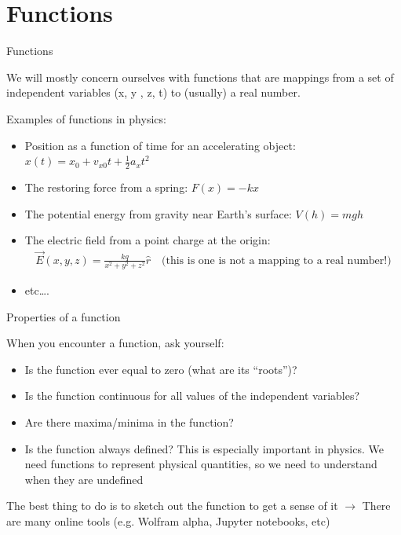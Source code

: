 \documentclass[aspectratio=169,
hyperref={colorlinks,urlcolor=blue}
]{beamer}
\begin{document}
\section{Functions}
\label{sec:functions}
\begin{bulletframe}{Functions}
 \item We will mostly concern ourselves with functions that are mappings from a set of independent variables (x, y , z, t) to (usually) a real number.
 \item Examples of functions in physics:
 \begin{itemize}
  \item Position as a function of time for an accelerating object: $x(t)=x_0+v_{x0}t+\frac{1}{2}a_xt^2$
 \item The restoring force from a spring: $F(x) = -kx$
 \item The potential energy from gravity near Earth’s surface: $V(h) = mgh$ 
 \item The electric field from a point charge at the origin: 
 \begin{align*}
 \vec E(x,y,z) =\frac{kq}{x ^2+y^2+z^2}\hat r \quad \text{(this is one is not a mapping to a real number!)}
 \end{align*} 
\item etc….
 \end{itemize}
\end{bulletframe}


\begin{bulletframe}{Properties of a function}
 \item When you encounter a function, ask yourself:
 \begin{itemize}
  \item Is the function ever equal to zero (what are its “roots”)?
 \item Is the function continuous for all values of the independent variables?
 \item Are there maxima/minima in the function?
 \item Is the function always defined? This is especially important in physics. We need functions to represent physical quantities, so we need to understand when they are undefined
 \end{itemize}
 \item The best thing to do is to sketch out the function to get a sense of it $\rightarrow$ There are many online tools (e.g. Wolfram alpha, Jupyter notebooks, etc)
\end{bulletframe}
\end{document}
